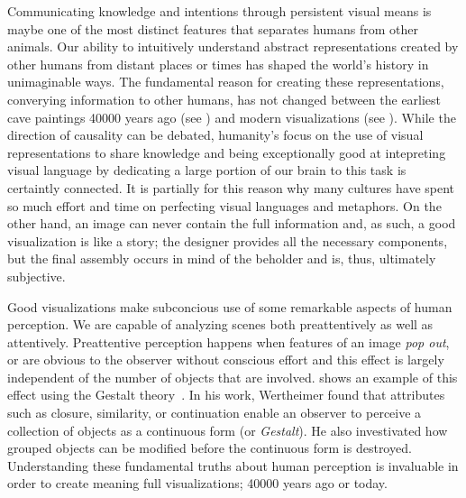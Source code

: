 Communicating knowledge and intentions through persistent visual means is maybe one of the most distinct features that separates humans from other animals.  Our ability to intuitively understand abstract representations created by other humans from distant places or times has shaped the world's history in unimaginable ways.  The fundamental reason for creating these representations, converying information to other humans, has not changed between the earliest cave paintings 40000 years ago (see ) and modern visualizations (see ).  While the direction of causality can be debated, humanity's focus on the use of visual representations to share knowledge and being exceptionally good at intepreting visual language by dedicating a large portion of our brain to this task is certaintly connected.  It is partially for this reason why many cultures have spent so much effort and time on perfecting visual languages and metaphors.  On the other hand, an image can never contain the full information and, as such, a good visualization is like a story;  the designer provides all the necessary components, but the final assembly occurs in mind of the beholder and is, thus, ultimately subjective.

Good visualizations make subconcious use of some remarkable aspects of human perception.  We are capable of analyzing scenes both preattentively as well as attentively.  Preattentive perception happens when features of an image \emph{pop out}, or are obvious to the observer without conscious effort and this effect is largely independent of the number of objects that are involved.   shows an example of this effect using the Gestalt theory~\cite{wertheimer1922untersuchungen}.  In his work, Wertheimer found that attributes such as closure, similarity, or continuation enable an observer to perceive a collection of objects as a continuous form (or \emph{Gestalt}).  He also investivated how grouped objects can be modified before the continuous form is destroyed.  Understanding these fundamental truths about human perception is invaluable in order to create meaning full visualizations;  40000 years ago or today.

